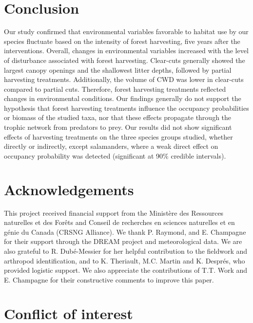 \section*{Conclusion}
\label{sec:conclu1}

Our study confirmed that environmental variables favorable to habitat use by our species fluctuate based on the intensity of forest harvesting, five years after the interventions. 
Overall, changes in environmental variables increased with the level of disturbance associated with forest harvesting. 
Clear-cuts generally showed the largest canopy openings and the shallowest litter depths, followed by partial harvesting treatments. 
Additionally, the volume of CWD was lower in clear-cuts compared to partial cuts. 
Therefore, forest harvesting treatments reflected changes in environmental conditions. 
Our findings generally do not support the hypothesis that forest harvesting treatments influence the occupancy probabilities or biomass of the studied taxa, nor that these effects propagate through the trophic network from predators to prey. 
Our results did not show significant effects of harvesting treatments on the three species groups studied, whether directly or indirectly, 
except salamanders, where a weak direct effect on occupancy probability was detected (significant at 90\% credible intervals). 

\clearpage

\section*{Acknowledgements}
\label{sec:acknowl1}

This project received financial support from the Ministère des Ressources naturelles et des Forêts and Conseil de recherches en sciences naturelles et en génie du Canada (CRSNG Alliance). 
We thank P. Raymond, and E. Champagne for their support through the DREAM project and meteorological data. 
We are also grateful to R. Dubé-Messier for her helpful contribution to the fieldwork and arthropod identification, and to K. Theriault, M.C. Martin and K. Després, who provided logistic support. 
We also appreciate the contributions of T.T. Work and E. Champagne for their constructive comments to improve this paper.

\section*{Conflict of interest}
\label{sec:conflict1}

